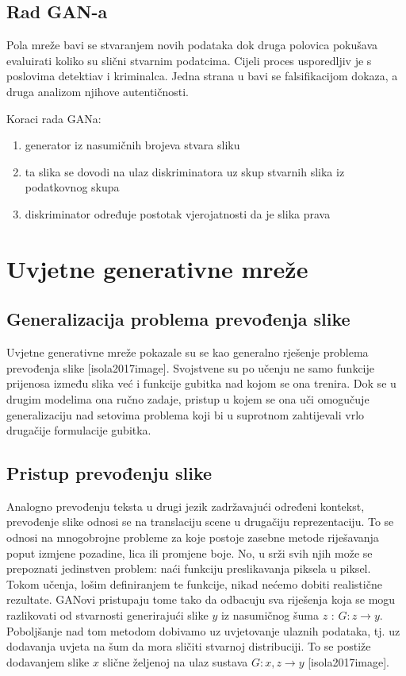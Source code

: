 \documentclass[lmodern, utf8, seminar]{fer}
\begin{document}
\section{Rad GAN-a}
Pola mreže bavi se stvaranjem novih podataka dok druga polovica pokušava evaluirati koliko su slični stvarnim podatcima.
Cijeli proces usporedljiv je s poslovima detektiav i kriminalca. Jedna strana u bavi se falsifikacijom dokaza, a druga analizom njihove autentičnosti.
\newline

Koraci rada GANa:
\begin{enumerate} 
\item generator iz nasumičnih brojeva stvara sliku
\item ta slika se dovodi na ulaz diskriminatora uz skup stvarnih slika iz podatkovnog skupa
\item diskriminator određuje postotak vjerojatnosti da je slika prava
\end{enumerate}



\chapter{Uvjetne generativne mreže}
\section{Generalizacija problema prevođenja slike}
Uvjetne generativne mreže pokazale su se kao generalno rješenje problema prevođenja slike [isola2017image]. Svojstvene su po učenju ne samo funkcije prijenosa između slika već i funkcije gubitka nad kojom se ona trenira.
Dok se u drugim modelima ona ručno zadaje, pristup u kojem se ona uči omogučuje generalizaciju nad setovima problema koji bi u suprotnom zahtijevali vrlo drugačije formulacije gubitka.
\newline

\section{Pristup prevođenju slike}
Analogno prevođenju teksta u drugi jezik zadržavajući određeni kontekst, prevođenje slike odnosi se na translaciju scene u drugačiju reprezentaciju. To se odnosi na mnogobrojne probleme za koje postoje zasebne metode riješavanja poput izmjene pozadine, lica ili promjene boje. No, u srži svih njih može se prepoznati jedinstven problem: naći funkciju preslikavanja piksela u piksel. Tokom učenja, lošim definiranjem te funkcije, nikad nećemo dobiti realistične rezultate. GANovi pristupaju tome tako da odbacuju sva riješenja koja se mogu razlikovati od stvarnosti generirajući slike $y$ iz nasumičnog šuma $z$ : $G: z \rightarrow y$. Poboljšanje nad tom metodom dobivamo uz uvjetovanje ulaznih podataka, tj. uz dodavanja uvjeta na šum da mora sličiti stvarnoj distribuciji. To se postiže dodavanjem slike $x$ slične željenoj na ulaz sustava $G: {x,z} \rightarrow y$ [isola2017image].
\end{document}
